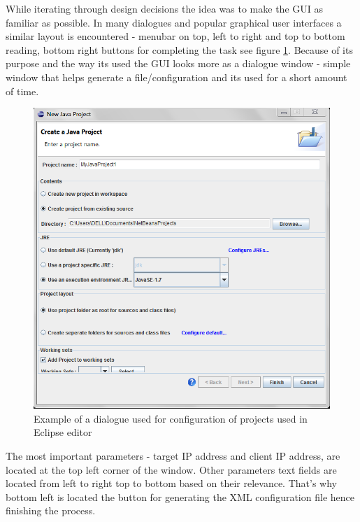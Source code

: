 While iterating through design decisions the idea was to make the GUI as familiar as possible. In many dialogues
and popular graphical user interfaces a similar layout is encountered - menubar on top, left to right and
top to bottom reading, bottom right buttons for completing the task see figure \ref{fig:guiex}. Because
of its purpose and the way its used the GUI looks more as a dialogue window - simple window that helps 
generate a file/configuration and its used for a short amount of time.

\begin{figure}[htp]
\centering
\includegraphics[scale=0.6]{Figures/gui_example1.png}
\caption{Example of a dialogue used for configuration of projects used in Eclipse editor}
\label{fig:guiex}
\end{figure}

The most important parameters - target IP address and client IP address,
are located at the top left corner of the window. Other parameters text fields are located from left  to right top to bottom
based on their relevance. That's why bottom left is located the button for generating the XML configuration
file hence finishing the process.

